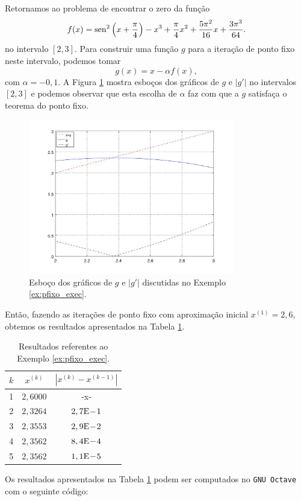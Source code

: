 \begin{ex}\label{ex:pfixo_exec}
  Retornamos ao problema de encontrar o zero da função
  \begin{equation}
    f(x) = \operatorname{sen}^2\left(x+\frac{\pi}{4}\right) - x^3 + \frac{\pi}{4}x^2 + \frac{5\pi^2}{16}x + \frac{3\pi^3}{64}.
  \end{equation}
  no intervalo $[2,3]$. Para construir uma função $g$ para a iteração de ponto fixo neste intervalo, podemos tomar
  \begin{equation}
    g(x) = x - \alpha f(x),
  \end{equation}
com $\alpha = -0,1$. A Figura \ref{fig:ex_pfixo_exec} mostra esboços dos gráficos de $g$ e $|g'|$ no intervalos $[2, 3]$ e podemos observar que esta escolha de $\alpha$ faz com que a $g$ satisfaça o teorema do ponto fixo.

\begin{figure}[h!]
  \centering
  \includegraphics[width=0.8\textwidth]{./cap_eq1d/dados/ex_pfixo_exec/fig_ex_pfixo_exec}
  \caption{Esboço dos gráficos de $g$ e $|g'|$ discutidas no Exemplo \ref{ex:pfixo_exec}.}
  \label{fig:ex_pfixo_exec}
\end{figure}

Então, fazendo as iterações de ponto fixo com aproximação inicial $x^{(1)}=2,6$, obtemos os resultados apresentados na Tabela \ref{tab:ex_pfixo_exec}.

\begin{table}[h!]
  \centering
  \caption{Resultados referentes ao Exemplo \ref{ex:pfixo_exec}.}
  \label{tab:ex_pfixo_exec}
  \begin{tabular}{r|cc}
    $k$ & $x^{(k)}$ & $|x^{(k)}-x^{(k-1)}|$ \\\hline
    1 & $2,6000$ & -x-\\
    2 & $2,3264$ & $2,7\mathrm{E}\!-\!1$ \\
    3 & $2,3553$ & $2,9\mathrm{E}\!-\!2$ \\
    4 & $2,3562$ & $8,4\mathrm{E}\!-\!4$ \\
    5 & $2,3562$ & $1,1\mathrm{E}\!-\!5$ \\\hline
  \end{tabular}
\end{table}

\ifisoctave
Os resultados apresentados na Tabela \ref{tab:ex_pfixo_exec} podem ser computados no \verb+GNU Octave+ com o seguinte código:

\fi
\end{ex}

